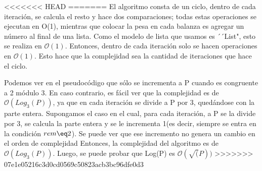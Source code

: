 \documentclass[spanish,12pt]{article}
\begin{document}
{<<<<<<< HEAD
%
%
=======
El algoritmo consta de un ciclo, dentro de cada iteración, se calcula el resto y hace dos comparaciones; todas estas operaciones se ejecutan en O(1), mientras que colocar la pesa en cada balanza
es agregar un número al final de una lista. Como el modelo de lista que usamos es ´´List", esto se realiza en $\mathcal{O}(1)$.
Entonces, dentro de cada iteración solo se hacen operaciones en $\mathcal{O}(1)$. Esto hace que la complejidad sea la cantidad de iteraciones que hace el ciclo.


Podemos ver en el pseudocódigo que sólo se incrementa a P cuando es congruente a 2 módulo 3. En caso contrario, es fácil ver que la complejidad es de $\mathcal{O}(Log_{3}(P))$, ya que en cada iteración se divide a P por 3, quedándose con la parte entera.
Supongamos el caso en el cual, para cada iteración, a P se la divide por 3, se calcula la parte entera y se le incrementa 1(es decir, siempre se entra en la condición $rem \eq 2$). Se puede ver que ese incremento no genera un cambio en el orden de complejidad
Entonces, la complejidad del algoritmo es de $\mathcal{O}(Log_{3}(P))$.
Luego, se puede probar que Log(P) es $\mathcal{O}(\sqrt(P))$
>>>>>>> 07e1e05216c3d0cd0569c50823acb3bc96dfe0d3




}
\end{document}
